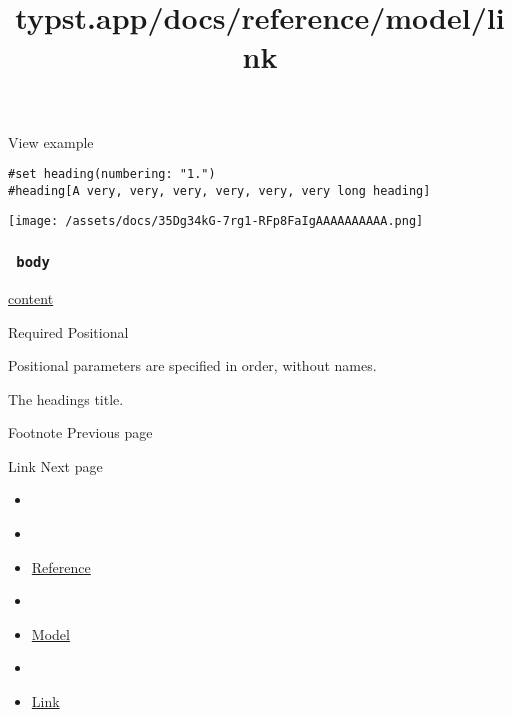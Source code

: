 
View example

\begin{verbatim}
#set heading(numbering: "1.")
#heading[A very, very, very, very, very, very long heading]
\end{verbatim}

\texttt{[image: /assets/docs/35Dg34kG-7rg1-RFp8FaIgAAAAAAAAAA.png]}

\subsubsection{\texorpdfstring{\texttt{\ body\ }}{ body }}\label{parameters-body}

\href{/docs/reference/foundations/content/}{content}

{Required} {{ Positional }}

\label{parameters-body-positional-tooltip}
Positional parameters are specified in order, without names.

The heading\textquotesingle s title.

\href{/docs/reference/model/footnote/}{\pandocbounded{}}

{ Footnote } { Previous page }

\href{/docs/reference/model/link/}{\pandocbounded{}}

{ Link } { Next page }


\title{typst.app/docs/reference/model/link}

\begin{itemize}
\tightlist
\item
  \href{/docs}{}
\item
  
\item
  \href{/docs/reference/}{Reference}
\item
  
\item
  \href{/docs/reference/model/}{Model}
\item
  
\item
  \href{/docs/reference/model/link/}{Link}
\end{itemize}

